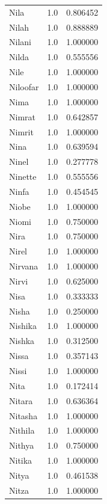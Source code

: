 \documentclass[
  letterpaper,
  DIV=11,
  numbers=noendperiod]{scrreprt}
\begin{document}
\begin{tabular}{lrr}
Nila            &   1.0 &   0.806452 \\
Nilah           &   1.0 &   0.888889 \\
Nilani          &   1.0 &   1.000000 \\
Nilda           &   1.0 &   0.555556 \\
Nile            &   1.0 &   1.000000 \\
Niloofar        &   1.0 &   1.000000 \\
Nima            &   1.0 &   1.000000 \\
Nimrat          &   1.0 &   0.642857 \\
Nimrit          &   1.0 &   1.000000 \\
Nina            &   1.0 &   0.639594 \\
Ninel           &   1.0 &   0.277778 \\
Ninette         &   1.0 &   0.555556 \\
Ninfa           &   1.0 &   0.454545 \\
Niobe           &   1.0 &   1.000000 \\
Niomi           &   1.0 &   0.750000 \\
Nira            &   1.0 &   0.750000 \\
Nirel           &   1.0 &   1.000000 \\
Nirvana         &   1.0 &   1.000000 \\
Nirvi           &   1.0 &   0.625000 \\
Nisa            &   1.0 &   0.333333 \\
Nisha           &   1.0 &   0.250000 \\
Nishika         &   1.0 &   1.000000 \\
Nishka          &   1.0 &   0.312500 \\
Nissa           &   1.0 &   0.357143 \\
Nissi           &   1.0 &   1.000000 \\
Nita            &   1.0 &   0.172414 \\
Nitara          &   1.0 &   0.636364 \\
Nitasha         &   1.0 &   1.000000 \\
Nithila         &   1.0 &   1.000000 \\
Nithya          &   1.0 &   0.750000 \\
Nitika          &   1.0 &   1.000000 \\
Nitya           &   1.0 &   0.461538 \\
Nitza           &   1.0 &   1.000000 \\

\end{tabular}
\end{document}
